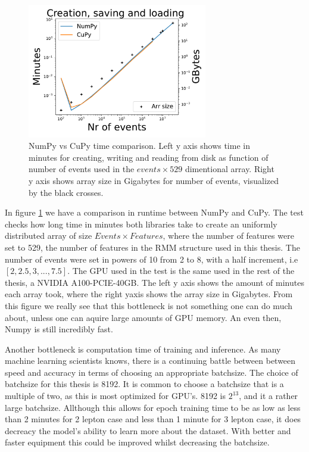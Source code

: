 \begin{figure}[H]
    \caption[NumPy vs CuPy time comparison]{NumPy vs CuPy time comparison. Left y axis shows time in minutes for 
    creating, writing and reading from disk as function of number of events used in the $events\times 529$ dimentional array. 
    Right y axis shows array size in Gigabytes for number of events, visualized by the black crosses. }
    \label{fig:cupy_comp}
    \centering
    \includegraphics[width=0.7\textwidth]{Figures/atlas/cupy_testing.pdf}
\end{figure}

In figure \ref{fig:cupy_comp} we have a comparison in runtime between NumPy and CuPy. The test checks how long time 
in minutes both libraries take to create an uniformly distributed array of size $Events\times Features$, where the 
number of features were set to 529, the number of features in the RMM structure used in this thesis. The number of events 
were set in powers of 10 from 2 to 8, with a half increment, i.e $[2, 2.5, 3, ..., 7.5]$. The GPU used in the test 
is the same used in the rest of the thesis, a NVIDIA A100-PCIE-40GB. The left y axis shows the amount of minutes 
each array took, where the right yaxis shows the array size in Gigabytes. From this figure we really see that this 
bottleneck is not something one can do much about, unless one can aquire large amounts of GPU memory. An even then, 
Numpy is still incredibly fast. \par 
Another bottleneck is computation time of training and inference. As many machine learning scientists knows, 
there is a continuing battle between between speed and accuracy in terms of choosing an appropriate batchsize. 
The choice of batchsize for this thesis is 8192. It is common to choose a batchsize that is a multiple of two, 
as this is most optimized for GPU's. 8192 is $2^{13}$, and it a rather large batchsize. Allthough this allows for 
epoch training time to be as low as less than 2 minutes for 2 lepton case and less than 1 minute for 3 lepton case,
it does decreacy the model's ability to learn more about the dataset. With better and faster equipment this could 
be improved whilst decreasing the batchsize. 


